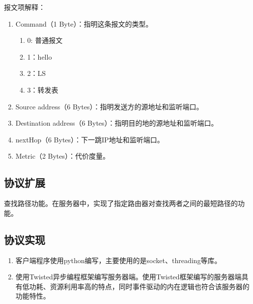		\par 报文项解释：
		\begin{enumerate}
			\item Command（1 Byte）：指明这条报文的类型。
				\begin{enumerate}[]
					\item 0: 普通报文
					\item 1：hello
					\item 2：LS
					\item 3：转发表
				\end{enumerate}
			\item Source address（6 Bytes）：指明发送方的源地址和监听端口。
			\item Destination address（6 Bytes）：指明目的地的源地址和监听端口。
			\item nextHop（6 Bytes）：下一跳IP地址和监听端口。
			\item Metric（2 Bytes）：代价度量。
		\end{enumerate}
			
	\subsection{协议扩展} %
	\label{sub:协议扩展}
		查找路径功能。在服务器中，实现了指定路由器对查找两者之间的最短路径的功能。
	\subsection{协议实现} %
	\label{sub:协议实现}
		\begin{enumerate}
			\item 客户端程序使用python编写，主要使用的是socket、threading等库。
			\item 使用Twisted异步编程框架编写服务器端。使用Twisted框架编写的服务器端具有低功耗、资源利用率高的特点，同时事件驱动的内在逻辑也符合该服务器的功能特性。
		\end{enumerate}

